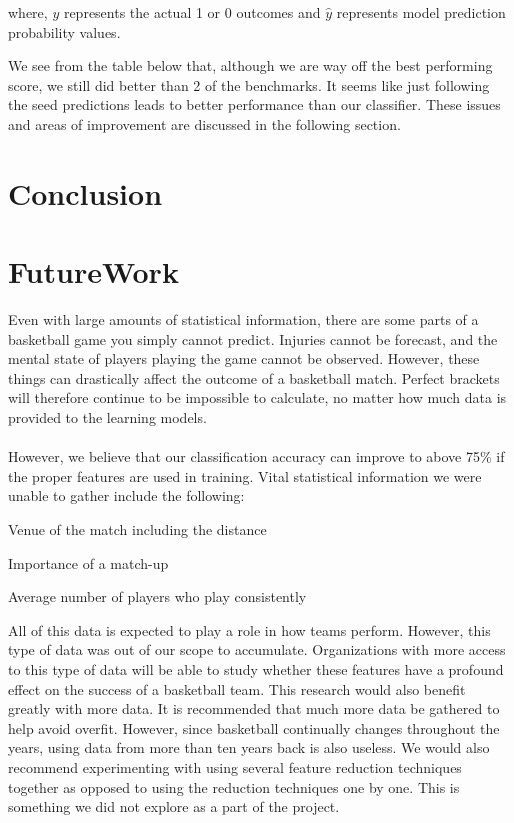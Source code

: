\documentclass{article}
\begin{document}
\begin{multicols}{2}
	 where, $y$ represents the actual 1 or 0 outcomes and $\hat{y}$ represents model prediction probability values. 
	 
	 \begin{center}		
	\end{center}
	
	We see from the table below that, although we are way off the best performing score, we still did better than 2 of the benchmarks. It seems like just following the seed predictions leads to better performance than our classifier. These issues and areas of improvement are discussed in the following section.
	 
	\section{Conclusion}
	\section{FutureWork}	 
Even with large amounts of statistical information, there are some parts of a basketball game you simply cannot predict. Injuries cannot be forecast, and the mental state of players playing the game cannot be observed. However, these things can drastically affect the outcome of a basketball match. Perfect brackets will therefore continue to be impossible to calculate, no matter how much data is provided to the learning models.

\paragraph{}However, we believe that our classification accuracy can improve to above 75\% if the proper features are used in training. Vital statistical information we were unable to gather include the following:
\begin{list}{•}
\item
Venue of the match including the distance
\item
Importance of a match-up
\item
Average number of players who play consistently
\end{list}

All of this data is expected to play a role in how teams perform. However, this type of data was out of our scope to accumulate. Organizations with more access to this type of data will be able to study whether these features have a profound effect on the success of a basketball team. This research would also benefit greatly with more data. It is recommended that much more data be gathered to help avoid overfit. However, since basketball continually changes throughout the years, using data from more than ten years back is also useless. We would also recommend experimenting with using several feature reduction techniques together as opposed to using the reduction techniques one by one. This is something we did not explore as a part of the project.
	
	\end{multicols} 
\end{document}
